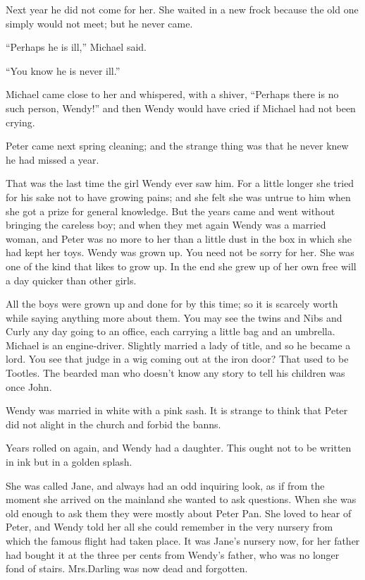 Next year he did not come for her.
She waited in a new frock because the old one simply would not meet;
but he never came.

“Perhaps he is ill,” Michael said.

“You know he is never ill.”

Michael came close to her and whispered, with a shiver,
“Perhaps there is no such person, Wendy!\@”
and then Wendy would have cried if Michael had not been crying.

Peter came next spring cleaning;
and the strange thing was that he never knew he had missed a year.

That was the last time the girl Wendy ever saw him.
For a little longer she tried for his sake not to have growing pains;
and she felt she was untrue to him when she got a prize for general knowledge.
But the years came and went without bringing the careless boy;
and when they met again Wendy was a married woman,
and Peter was no more to her than a little dust in the box in which she had kept her toys.
Wendy was grown up.
You need not be sorry for her.
She was one of the kind that likes to grow up.
In the end she grew up of her own free will a day quicker than other girls.

All the boys were grown up and done for by this time;
so it is scarcely worth while saying anything more about them.
You may see the twins and Nibs and Curly any day going to an office,
each carrying a little bag and an umbrella.
Michael is an engine‐driver.
Slightly married a lady of title, and so he became a lord.
You see that judge in a wig coming out at the iron door?
That used to be Tootles.
The bearded man who doesn’t know any story to tell his children was once John.

Wendy was married in white with a pink sash.
It is strange to think that Peter did not alight in the church and forbid the banns.

Years rolled on again, and Wendy had a daughter.
This ought not to be written in ink but in a golden splash.

She was called Jane, and always had an odd inquiring look,
as if from the moment she arrived on the mainland she wanted to ask questions.
When she was old enough to ask them they were mostly about Peter Pan.
She loved to hear of Peter,
and Wendy told her all she could remember in the very nursery from which the famous flight had taken place.
It was Jane’s nursery now,
for her father had bought it at the three per cents from Wendy’s father,
who was no longer fond of stairs.
Mrs.\@ Darling was now dead and forgotten.

